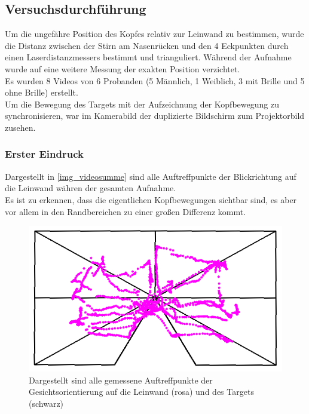 \subsection{Versuchsdurchführung}
Um die ungefähre Position des Kopfes relativ zur Leinwand zu bestimmen, wurde die Distanz zwischen der Stirn am Nasenrücken und den 4 Eckpunkten durch einen Laserdistanzmessers bestimmt und trianguliert. Während der Aufnahme wurde auf eine weitere Messung der exakten Position verzichtet.\\
Es wurden 8 Videos von 6 Probanden (5 Männlich, 1 Weiblich, 3 mit Brille und 5 ohne Brille) erstellt.\\
Um die Bewegung des Targets mit der Aufzeichnung der Kopfbewegung zu synchronisieren, war im Kamerabild der duplizierte Bildschirm zum Projektorbild zusehen.
\subsubsection{Erster Eindruck}
Dargestellt in \autoref{img_videosumme} sind alle Auftreffpunkte der Blickrichtung auf die Leinwand währen der gesamten Aufnahme.\\
Es ist zu erkennen, dass die eigentlichen Kopfbewegungen sichtbar sind, es aber vor allem in den Randbereichen zu einer großen Differenz kommt.\\
\begin{figure}
	\centering
	\includegraphics[width=0.7\linewidth]{OpenFace_Img/VideoSumme}
	\caption{Dargestellt sind alle gemessene Auftreffpunkte der Gesichtsorientierung auf die Leinwand (rosa) und des Targets (schwarz)}
	\label{img_videosumme}
\end{figure}
